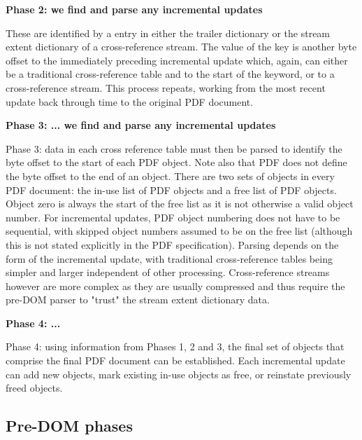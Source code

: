 {\bf{Phase 2: we find and parse any incremental updates}}

These are identified by a  entry in either the trailer
dictionary or the stream extent dictionary of a cross-reference stream. The
value of the  key is another byte offset to the immediately
preceding incremental update which, again, can either be a traditional
cross-reference table and to the start of the  keyword, or to a
cross-reference stream. This process repeats, working from the most recent
update back through time to the original PDF document.

{\bf{Phase 3: ... we find and parse any incremental updates}}
  
Phase 3: data in each cross reference table must then be parsed to
identify the byte offset to the start of each PDF object. Note also that PDF
does not define the byte offset to the end of an object. There are two sets of
objects in every PDF document: the in-use list of PDF objects and a free list
of PDF objects. Object zero is always the start of the free list as it is not
otherwise a valid object number. For incremental updates, PDF object numbering
does not have to be sequential, with skipped object numbers assumed to be on
the free list (although this is not stated explicitly in the PDF
specification). Parsing depends on the form of the incremental update, with
traditional cross-reference tables being simpler and larger independent of
other processing. Cross-reference streams however are more complex as they are
usually compressed and thus require the pre-DOM parser to "trust" the stream
extent dictionary data.

{\bf{Phase 4: ...}}
  
Phase 4: using information from Phases 1, 2 and 3, the final set of
objects that comprise the final PDF document can be established. Each
incremental update can add new objects, mark existing in-use objects as free,
or reinstate previously freed objects. 
  
\subsection{Pre-DOM phases}

\iffalse
\begin{code}
{-# LANGUAGE EmptyDataDecls, TypeOperators, LambdaCase #-}
module Spec where

import           Control.Monad
import           Data.Char
import           Data.Foldable(foldlM)
import qualified Data.Map as M
import           Data.Map(Map)

import           Types
import           Utils
import           Primitives
\end{code}
\fi


